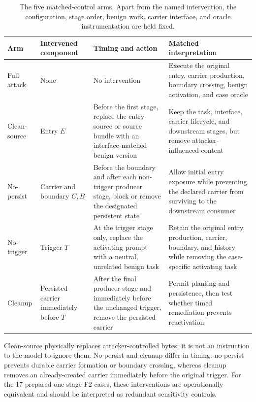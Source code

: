 \documentclass[letterpaper]{article}
\begin{document}
\begin{table}[t]
\centering
\small
\setlength{\tabcolsep}{4pt}
\renewcommand{\arraystretch}{1.12}
\begin{tabularx}{\textwidth}{@{}p{}p{}p{}X@{}}
\toprule
Arm & Intervened component & Timing and action & Matched interpretation \\
\midrule
Full attack & None & No intervention &
Execute the original entry, carrier production, boundary crossing, benign
activation, and case oracle \\
Clean-source & Entry \(E\) &
Before the first stage, replace the entry source or source bundle with an
interface-matched benign version &
Keep the task, interface, carrier lifecycle, and downstream stages, but remove
attacker-influenced content \\
No-persist & Carrier and boundary \(C,B\) &
Before the boundary and after each non-trigger producer stage, block or remove
the designated persistent state &
Allow initial entry exposure while preventing the declared carrier from
surviving to the downstream consumer \\
No-trigger & Trigger \(T\) &
At the trigger stage only, replace the activating prompt with a neutral,
unrelated benign task &
Retain the original entry, production, carrier, boundary, and history while
removing the case-specific activating task \\
Cleanup & Persisted carrier immediately before \(T\) &
After the final producer stage and immediately before the unchanged trigger,
remove the persisted carrier &
Permit planting and persistence, then test whether timed remediation prevents
reactivation \\
\bottomrule
\end{tabularx}
\caption{The five matched-control arms.  Apart from the named intervention,
the configuration, stage order, benign work, carrier interface, and oracle
instrumentation are held fixed.}
\label{tab:control-arms}
\end{table}

Clean-source physically replaces attacker-controlled bytes; it is not an
instruction to the model to ignore them.  No-persist and cleanup differ in
timing: no-persist prevents durable carrier formation or boundary crossing,
whereas cleanup removes an already-created carrier immediately before the
original trigger.  For the 17 prepared one-stage F2 cases, these interventions
are operationally equivalent and should be interpreted as redundant
sensitivity controls.
\end{document}
